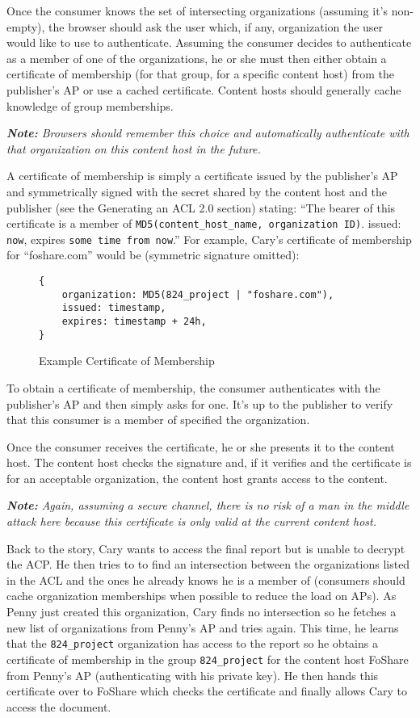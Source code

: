 \documentclass[pdftex,12pt,a4papaer]{article}
\newcommand{\note}[1]{\textit{\textbf{Note:} #1}}
\begin{document}
Once the consumer knows the set of intersecting organizations (assuming it's
non-empty), the browser should ask the user which, if any, organization the user
would like to use to authenticate. Assuming the consumer decides to authenticate
as a member of one of the organizations, he or she must then either obtain a
certificate of membership (for that group, for a specific content host) from the
publisher's AP or use a cached certificate. Content hosts should generally cache
knowledge of group memberships.

\note{Browsers should remember this choice and automatically authenticate with
that organization on this content host in the future.}

A certificate of membership is simply a certificate issued by the publisher's AP
and symmetrically signed with the secret shared by the content host and the
publisher (see the Generating an ACL 2.0 section) stating: ``The bearer of this
certificate is a member of \texttt{MD5(content\_host\_name, organization ID)}. issued:
\texttt{now}, expires \texttt{some time from now}.'' For example, Cary's certificate
of membership for ``foshare.com'' would be (symmetric signature omitted):

\begin{figure}[H]
\begin{verbatim}
{
    organization: MD5(824_project | "foshare.com"),
    issued: timestamp,
    expires: timestamp + 24h,
}
\end{verbatim}
\caption{Example Certificate of Membership}
\end{figure}

To obtain a certificate of membership, the consumer authenticates with the
publisher's AP and then simply asks for one. It's up to the publisher to verify
that this consumer is a member of specified the organization.

Once the consumer receives the certificate, he or she presents it to the content
host. The content host checks the signature and, if it verifies and the
certificate is for an acceptable organization, the content host grants access to
the content.

\note{Again, assuming a secure channel, there is no risk of a man in the middle
attack here because this certificate is only valid at the current content host.}

Back to the story, Cary wants to access the final report but is unable to
decrypt the ACP\@. He then tries to to find an intersection between the
organizations listed in the ACL and the ones he already knows he is a member of
(consumers should cache organization memberships when possible to reduce the
load on APs). As Penny just created this organization, Cary finds no
intersection so he fetches a new list of organizations from Penny's AP and tries
again. This time, he learns that the \texttt{824\_project} organization has access
to the report so he obtains a certificate of membership in the group
\texttt{824\_project} for the content host FoShare from Penny's AP
(authenticating with his private key). He then hands this certificate over to
FoShare which checks the certificate and finally allows Cary to access the
document.
\end{document}
